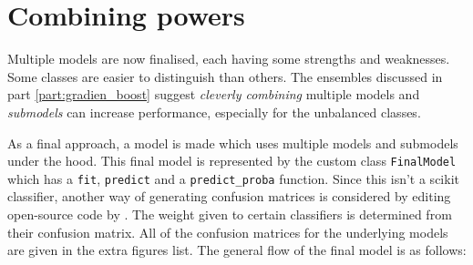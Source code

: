 \section{Combining powers}
\label{section:opt_ensemble}

Multiple models are now finalised, each having some strengths and weaknesses.
Some classes are easier to distinguish than others.
The ensembles discussed in part \ref{part:gradien_boost} suggest \textit{cleverly combining} multiple models and \textit{submodels} can increase performance, especially for the unbalanced classes.

As a final approach, a model is made which uses multiple models and submodels under the hood.
This final model is represented by the custom class \texttt{FinalModel} which has a \texttt{fit}, \texttt{predict} and a \texttt{predict\_proba} function.
Since this isn't a scikit classifier, another way of generating confusion matrices is considered by editing open-source code by \citet{pretty_cm}.
The weight given to certain classifiers is determined from their confusion matrix.
All of the confusion matrices for the underlying models are given in the extra figures list.
The general flow of the final model is as follows:

